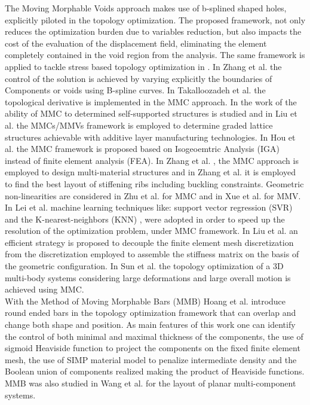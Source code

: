 The Moving Morphable Voids approach \cite{zhang2017explicit} makes use of b-splined shaped holes, explicitly piloted in the topology optimization. The proposed framework, not only reduces the optimization burden due to variables reduction, but also impacts the cost of the evaluation of the displacement field, eliminating the element completely contained in the void region from the analysis. The same framework is applied to tackle stress based topology optimization in \cite{zhang2018moving}.
In Zhang et al. \cite{zhang2017structuralo} the control of the solution is achieved by varying explicitly the boundaries of Components or voids using B-spline curves.  
In Takalloozadeh et al. \cite{takalloozadeh2017implementation} the topological derivative is implemented in the MMC approach.
 In the work of \cite{guo2017self} the ability of MMC to determined self-supported structures is studied and in Liu et al. \cite{liu2017additive} the MMCs/MMVs framework is employed to determine graded lattice structures achievable with additive layer manufacturing technologies. In Hou et al. \cite{hou2017explicit} the MMC framework is proposed based on Isogeoemtric Analysis (IGA) instead of finite element analysis (FEA). In Zhang et al. \cite{zhang2018topology}, the MMC approach is employed to design multi-material structures and in Zhang et al. \cite{zhang2018movings} it is employed to find the best layout of stiffening ribs including buckling constraints. Geometric non-linearities are considered in Zhu et al. \cite{zhu2018structural} for MMC and in Xue et al. \cite{xue2019explicit} for MMV.
  In Lei et al. \cite{lei2019machine} machine learning techniques like:  support vector regression (SVR) \cite{smola2004tutorial} and the K-nearest-neighbors (KNN) \cite{altman1992introduction}, were adopted in order to speed up the resolution of the optimization problem, under MMC framework. In Liu et al. \cite{liu2018efficient} an efficient strategy is proposed to decouple the finite element mesh discretization from the discretization employed to assemble the stiffness matrix on the basis of the geometric configuration.
  In Sun et al. \cite{sun2018topology} the topology optimization of a 3D multi-body systems considering large deformations and large overall motion is achieved using MMC.\\  
With the Method of Moving Morphable Bars (MMB) Hoang et al. \cite{hoang2017topology} introduce round ended bars in the topology optimization framework that can overlap and change both shape and position. As main features of this work one can identify the control of both minimal and maximal thickness of the components, the use of sigmoid Heaviside function to project the components on the fixed finite element mesh, the use of SIMP material model to penalize intermediate density and the Boolean union of components realized making the product of Heaviside functions. MMB was also studied in Wang et al. \cite{wang2018explicit} for the layout of planar multi-component systems. \\
